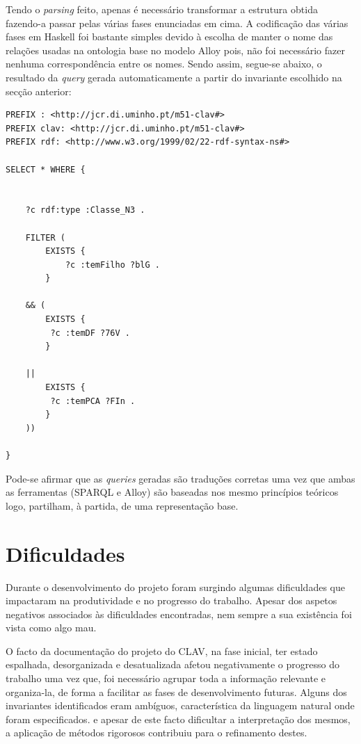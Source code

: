 \documentclass[tikz,runningheads,a4paper]{llncs}
\begin{document}
Tendo o \textit{parsing} feito, apenas é necessário transformar a estrutura
obtida fazendo-a passar pelas várias fases enunciadas em cima. A codificação das
várias fases em Haskell foi bastante simples devido à escolha de manter o nome
das relações usadas na ontologia base no modelo Alloy pois, não foi necessário
fazer nenhuma correspondência entre os nomes. Sendo assim, segue-se abaixo, o resultado da 
\textit{query} gerada automaticamente a partir do invariante escolhido na secção
anterior:

\begin{lstlisting}[language=sparql, frame=single, basicstyle=\scriptsize]
PREFIX : <http://jcr.di.uminho.pt/m51-clav#> 
PREFIX clav: <http://jcr.di.uminho.pt/m51-clav#> 
PREFIX rdf: <http://www.w3.org/1999/02/22-rdf-syntax-ns#> 

SELECT * WHERE {


    ?c rdf:type :Classe_N3 . 

    FILTER ( 
        EXISTS { 	
            ?c :temFilho ?blG . 
        } 

    && (
        EXISTS { 	
         ?c :temDF ?76V . 
        } 

    || 
        EXISTS { 	
         ?c :temPCA ?FIn . 
        } 
    ))

}
\end{lstlisting}

Pode-se afirmar que as \textit{queries} geradas são traduções corretas uma vez que ambas as
ferramentas (SPARQL e Alloy) são baseadas nos mesmo princípios teóricos logo,
partilham, à partida, de uma representação base.

\section{Dificuldades}

Durante o desenvolvimento do projeto foram surgindo algumas dificuldades que impactaram na produtividade e no progresso do trabalho. Apesar dos aspetos negativos associados às dificuldades encontradas, nem sempre a sua existência foi vista como algo mau.

O facto da documentação do projeto do CLAV, na fase inicial, ter estado espalhada, desorganizada e desatualizada afetou negativamente o progresso do trabalho uma vez que, foi necessário agrupar toda a informação relevante e organiza-la, de forma a facilitar as fases de desenvolvimento futuras. Alguns dos invariantes identificados eram ambíguos, característica da linguagem natural onde foram especificados. e apesar de este facto dificultar a interpretação dos mesmos, a aplicação de métodos rigorosos contribuiu para o refinamento destes.
\end{document}
